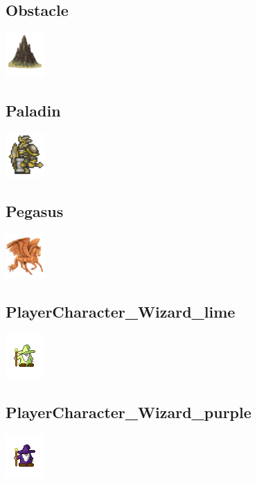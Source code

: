 \documentclass[a4paper,12pt]{scrartcl}
\begin{document}
	\subsection{Obstacle}
	\begin{center}\includegraphics{Prog2_EA_V2/Art/Obstacle.png}\end{center}
	\subsection{Paladin}
	\begin{center}\includegraphics{Prog2_EA_V2/Art/Paladin.png}\end{center}
	\subsection{Pegasus}
	\begin{center}\includegraphics{Prog2_EA_V2/Art/Pegasus.png}\end{center}
	\subsection{PlayerCharacter\_Wizard\_lime}
	\begin{center}\includegraphics{Prog2_EA_V2/Art/PlayerCharacter_Wizard_lime.png}\end{center}
	\subsection{PlayerCharacter\_Wizard\_purple}
	\begin{center}\includegraphics{Prog2_EA_V2/Art/PlayerCharacter_Wizard_purple.png}\end{center}
\end{document}
